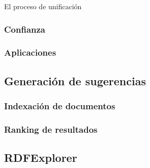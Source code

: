 El proceso de unificación 

\subsubsection{Confianza}

\subsubsection{Aplicaciones}

\subsection{Generación de sugerencias}

\subsubsection{Indexación de documentos}

\subsubsection{Ranking de resultados}

\subsection{RDFExplorer}

